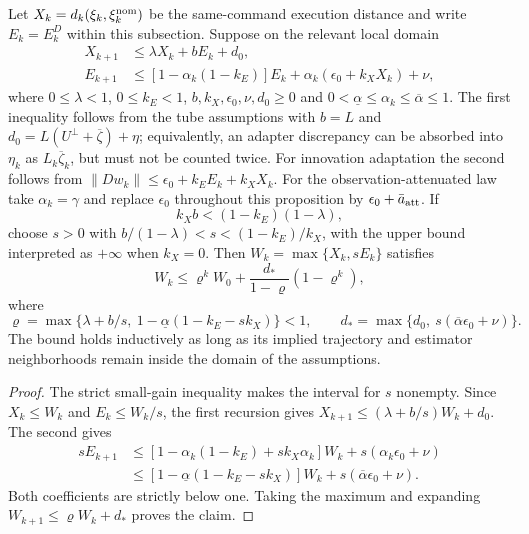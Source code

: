 \begin{proposition}
\label{prop:smallgain}
Let $X_k=d_k(\xi_k,\xi_{k}^{\rm nom})$ be the same-command execution distance and write
$E_k=E_k^D$ within this subsection. Suppose on
the relevant local domain
\begin{align}
 X_{k+1}&\le\lambda X_k+b E_k+d_0,\nonumber\\
 E_{k+1}&\le[1-\alpha_k(1-k_E)]E_k+
       \alpha_k(\epsilon_0+k_X X_k)+\nu,
 \label{eq:app-smallgain-recursions}
\end{align}
where $0\le\lambda<1$, $0\le k_E<1$, $b,k_X,\epsilon_0,\nu,d_0\ge0$ and
$0<\underline\alpha\le\alpha_k\le\overline\alpha\le1$.
The first inequality follows from the tube assumptions with
$b=L$ and $d_0=L(U^\perp+\overline\zeta)+\eta$;
equivalently, an adapter discrepancy can be absorbed into
$\eta_k$ as $L_k\overline\zeta_k$, but must not be counted twice.
For innovation adaptation the second follows from
$\|Dw_k\|\le\epsilon_0+k_E E_k+k_X X_k$. For the observation-attenuated
law take $\alpha_k=\gamma$ and replace $\epsilon_0$ throughout this
proposition by $\epsilon_0+\bar a_{\rm att}$. If
\begin{equation}
 k_Xb<(1-k_E)(1-\lambda),
 \label{eq:app-smallgain-condition}
\end{equation}
choose $s>0$ with
$b/(1-\lambda)<s<(1-k_E)/k_X$, with the upper bound
interpreted as $+\infty$ when $k_X=0$.
Then $W_k=\max\{X_k,s E_k\}$ satisfies
\begin{equation}
 W_k\le\varrho^k W_0+\frac{d_*}{1-\varrho}(1-\varrho^k),
 \label{eq:app-smallgain-bound}
\end{equation}
where
\begin{equation}
 \varrho=\max\{\lambda+b/s,\ 1-\underline\alpha(1-k_E-sk_X)\}<1,
 \qquad d_*=\max\{d_0,\ s(\overline\alpha\epsilon_0+\nu)\}.
 \label{eq:app-smallgain-constants}
\end{equation}
The bound holds inductively as long as its implied trajectory and estimator
neighborhoods remain inside the domain of the assumptions.
\end{proposition}
\begin{proof}
The strict small-gain inequality makes the interval for $s$ nonempty. Since
$X_k\le W_k$ and $E_k\le W_k/s$, the first recursion gives
$X_{k+1}\le(\lambda+b/s)W_k+d_0$. The second gives
\begin{align*}
 s E_{k+1}
 &\le[1-\alpha_k(1-k_E)+sk_X\alpha_k]W_k+s(\alpha_k\epsilon_0+\nu)\\
 &\le[1-\underline\alpha(1-k_E-sk_X)]W_k
       +s(\overline\alpha\epsilon_0+\nu).
\end{align*}
Both coefficients are strictly below one. Taking the maximum and expanding
$W_{k+1}\le\varrho W_k+d_*$ proves the claim.
\end{proof}

